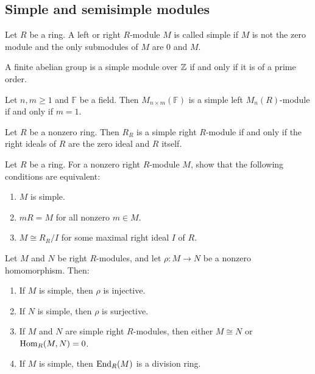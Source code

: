 \documentclass[11pt,a4paper]{article}
\begin{document}
\subsection{Simple and semisimple modules}

\begin{definition}
  Let $R$ be a ring.
  A left or right $R$-module $M$ is called simple if $M$ is not the zero
  module and the only submodules of $M$ are $0$ and $M$.
\end{definition}

\begin{example}
  A finite abelian group is a simple module over $\mathbb{Z}$ if and only if it is
  of a prime order.
\end{example}

\begin{example}
  Let $n,m \geq 1$ and $\mathbb F$ be a field.
  Then $M_{n \times m}(\mathbb F)$ is a simple left $M_n(R)$-module
  if and only if $m = 1$.
\end{example}

\begin{example}
  Let $R$ be a nonzero ring.
  Then $R_R$ is a simple right $R$-module if and only if the right ideals
  of $R$ are the zero ideal and $R$ itself.
\end{example}

\begin{exercise}
  Let $R$ be a ring.
  For a nonzero right $R$-module $M$,
  show that the following conditions are equivalent:
  \begin{enumerate}
    \item[(1)] $M$ is simple.
    \item[(2)] $mR = M$ for all nonzero $m \in M$.
    \item[(3)] $M \cong R_R/I$ for some maximal right ideal $I$ of $R$.
  \end{enumerate}
\end{exercise}

\begin{lemma}
  Let $M$ and $N$ be right $R$-modules,
  and let $\rho \colon M \to N$ be a nonzero homomorphism.
  Then:
  \begin{enumerate}
    \item[(1)] If $M$ is simple, then $\rho$ is injective.
    \item[(2)] If $N$ is simple, then $\rho$ is surjective.
    \item[(3)] If $M$ and $N$ are simple right $R$-modules,
      then either $M \cong N$ or $\operatorname{Hom}_R(M,N) = 0$.
    \item[(4)] If $M$ is simple, then $\operatorname{End}_R(M)$ is a division ring.
  \end{enumerate}
\end{lemma}
\end{document}
